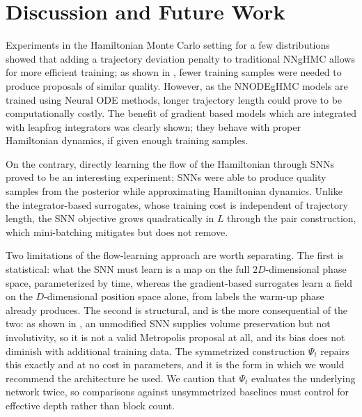 \documentclass{article}
\theoremstyle{plain}
\theoremstyle{definition}
\theoremstyle{remark}
\begin{document}
\section{Discussion and Future Work}
Experiments in the Hamiltonian Monte Carlo setting for a few distributions showed that adding a trajectory deviation penalty to traditional NNgHMC \cite{Li_2019} allows for more efficient training; as shown in , fewer training samples were needed to produce proposals of similar quality. However, as the NNODEgHMC models are trained using Neural ODE methods, longer trajectory length could prove to be computationally costly. The benefit of gradient based models which are integrated with leapfrog integrators was clearly shown; they behave with proper Hamiltonian dynamics, if given enough training samples.

On the contrary, directly learning the flow of the Hamiltonian through SNNs
proved to be an interesting experiment; SNNs were able to produce quality
samples from the posterior while approximating Hamiltonian dynamics. Unlike
the integrator-based surrogates, whose training cost is independent of
trajectory length, the SNN objective grows quadratically in $L$ through the
pair construction, which mini-batching mitigates but does not remove.

Two limitations of the flow-learning approach are worth separating. The first
is statistical: what the SNN must learn is a map on the full $2D$-dimensional
phase space, parameterized by time, whereas the gradient-based surrogates learn
a field on the $D$-dimensional position space alone, from labels the warm-up
phase already produces. The second is structural, and is the more consequential
of the two: as shown in , an unmodified SNN supplies
volume preservation but not involutivity, so it is not a valid Metropolis
proposal at all, and its bias does not diminish with additional training data.
The symmetrized construction $\Psi_t$ repairs this exactly and at no cost in
parameters, and it is the form in which we would recommend the architecture be
used. We caution that $\Psi_t$ evaluates the underlying network twice, so
comparisons against unsymmetrized baselines must control for effective depth
rather than block count.
\end{document}
